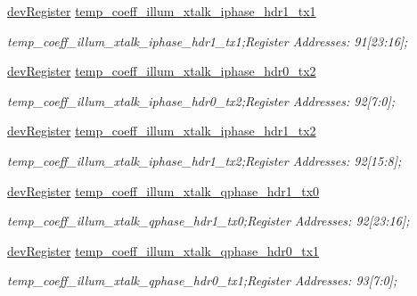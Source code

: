 \begin{DoxyCompactItemize}
\mbox{\hyperlink{classdev_register}{dev\+Register}} \mbox{\hyperlink{class_o_p_t3101_registers_a4690f0ee081e91239ab2fb12a7e3d56a}{temp\+\_\+coeff\+\_\+illum\+\_\+xtalk\+\_\+iphase\+\_\+hdr1\+\_\+tx1}}
\begin{DoxyCompactList}\small\item\em temp\+\_\+coeff\+\_\+illum\+\_\+xtalk\+\_\+iphase\+\_\+hdr1\+\_\+tx1;Register Addresses\+: 91\mbox{[}23\+:16\mbox{]}; \end{DoxyCompactList}\item 
\mbox{\hyperlink{classdev_register}{dev\+Register}} \mbox{\hyperlink{class_o_p_t3101_registers_a93b7474383c3d7439d972c5afe39ea07}{temp\+\_\+coeff\+\_\+illum\+\_\+xtalk\+\_\+iphase\+\_\+hdr0\+\_\+tx2}}
\begin{DoxyCompactList}\small\item\em temp\+\_\+coeff\+\_\+illum\+\_\+xtalk\+\_\+iphase\+\_\+hdr0\+\_\+tx2;Register Addresses\+: 92\mbox{[}7\+:0\mbox{]}; \end{DoxyCompactList}\item 
\mbox{\hyperlink{classdev_register}{dev\+Register}} \mbox{\hyperlink{class_o_p_t3101_registers_a567ef8a1973b1145d4e5993151226b30}{temp\+\_\+coeff\+\_\+illum\+\_\+xtalk\+\_\+iphase\+\_\+hdr1\+\_\+tx2}}
\begin{DoxyCompactList}\small\item\em temp\+\_\+coeff\+\_\+illum\+\_\+xtalk\+\_\+iphase\+\_\+hdr1\+\_\+tx2;Register Addresses\+: 92\mbox{[}15\+:8\mbox{]}; \end{DoxyCompactList}\item 
\mbox{\hyperlink{classdev_register}{dev\+Register}} \mbox{\hyperlink{class_o_p_t3101_registers_a9b2b71cc58b18ccd622e7820a8fcd5db}{temp\+\_\+coeff\+\_\+illum\+\_\+xtalk\+\_\+qphase\+\_\+hdr1\+\_\+tx0}}
\begin{DoxyCompactList}\small\item\em temp\+\_\+coeff\+\_\+illum\+\_\+xtalk\+\_\+qphase\+\_\+hdr1\+\_\+tx0;Register Addresses\+: 92\mbox{[}23\+:16\mbox{]}; \end{DoxyCompactList}\item 
\mbox{\hyperlink{classdev_register}{dev\+Register}} \mbox{\hyperlink{class_o_p_t3101_registers_a3386c4382a1b97a140a4fdc353e3b265}{temp\+\_\+coeff\+\_\+illum\+\_\+xtalk\+\_\+qphase\+\_\+hdr0\+\_\+tx1}}
\begin{DoxyCompactList}\small\item\em temp\+\_\+coeff\+\_\+illum\+\_\+xtalk\+\_\+qphase\+\_\+hdr0\+\_\+tx1;Register Addresses\+: 93\mbox{[}7\+:0\mbox{]}; \end{DoxyCompactList}\item 

\end{DoxyCompactItemize}
